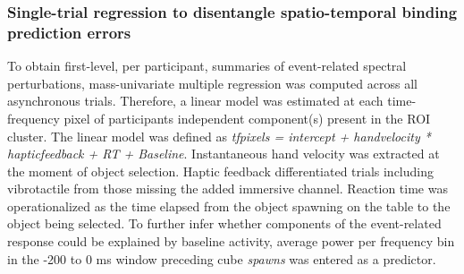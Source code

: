 \subsubsection{Single-trial regression to disentangle spatio-temporal binding prediction errors}
To obtain first-level, per participant, summaries of event-related spectral perturbations, mass-univariate multiple regression was computed across all asynchronous trials. Therefore, a linear model was estimated at each time-frequency pixel of participants independent component(s) present in the ROI cluster. The linear model was defined as \textit{tf\textunderscore pixels = intercept + hand\textunderscore velocity * haptic\textunderscore feedback + RT + Baseline}. Instantaneous hand velocity was extracted at the moment of object selection. Haptic feedback differentiated trials including vibrotactile from those missing the added immersive channel. Reaction time was operationalized as the time elapsed from the object spawning on the table to the object being selected. To further infer whether components of the event-related response could be explained by baseline activity, average power per frequency bin in the -200 to 0 ms window preceding cube \textit{spawns} was entered as a predictor.


